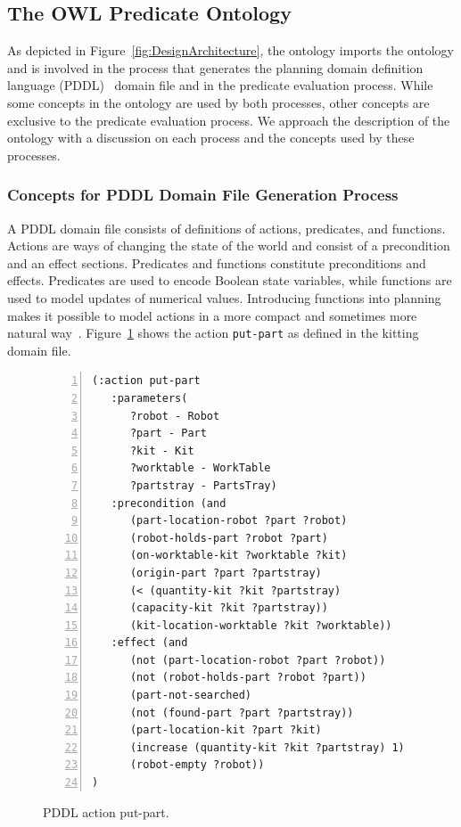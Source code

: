 \subsection{The OWL Predicate Ontology}\label{owlsoap}
As depicted in Figure~\ref{fig:DesignArchitecture}, the  ontology imports the  ontology and is involved in the process that generates the planning domain definition language (PDDL)~\cite{GHALLAB.PDDL.1998} domain file and in the predicate evaluation process. While some concepts in the  ontology are used by both processes, other concepts are exclusive to the predicate evaluation process. We approach the description of the  ontology with a discussion on each process and the concepts used by these processes.

\subsubsection{Concepts for PDDL Domain File Generation Process}\label{sss:domainfile}
A PDDL domain file consists of definitions of actions, predicates, and functions. Actions are ways of changing the state of the world and consist of a precondition and an effect sections. Predicates and functions constitute preconditions and effects. Predicates are used to encode Boolean state variables, while functions are used to model updates of numerical values. Introducing functions into planning makes it possible to model actions in a more compact and sometimes more natural way~\cite{FOX.JAIR.2003}. Figure~\ref{fig:put-part} shows the action \texttt{put-part} as defined in the kitting domain file.

\begin{figure}[t!h!]
\begin{minipage}{.8\paperwidth}
\begin{mylisting}
\begin{Verbatim}[commandchars=\\\{\},fontsize=\scriptsize, numbers=left, numbersep=2pt]
(:action put-part
   :parameters(
      ?robot - Robot
      ?part - Part
      ?kit - Kit
      ?worktable - WorkTable
      ?partstray - PartsTray)
   :precondition (and
      (part-location-robot ?part ?robot)
      (robot-holds-part ?robot ?part)
      (on-worktable-kit ?worktable ?kit)
      (origin-part ?part ?partstray)
      (< (quantity-kit ?kit ?partstray)
      (capacity-kit ?kit ?partstray))
      (kit-location-worktable ?kit ?worktable))
   :effect (and
      (not (part-location-robot ?part ?robot))
      (not (robot-holds-part ?robot ?part))
      (part-not-searched)
      (not (found-part ?part ?partstray))
      (part-location-kit ?part ?kit)
      (increase (quantity-kit ?kit ?partstray) 1)
      (robot-empty ?robot))
)
\end{Verbatim}
\end{mylisting}
\end{minipage}
\caption{PDDL action put-part.}
\label{fig:put-part}
\end{figure}

